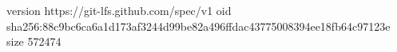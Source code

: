 version https://git-lfs.github.com/spec/v1
oid sha256:88c9bc6ca6a1d173af3244d99be82a496ffdac43775008394ee18fb64c97123e
size 572474
